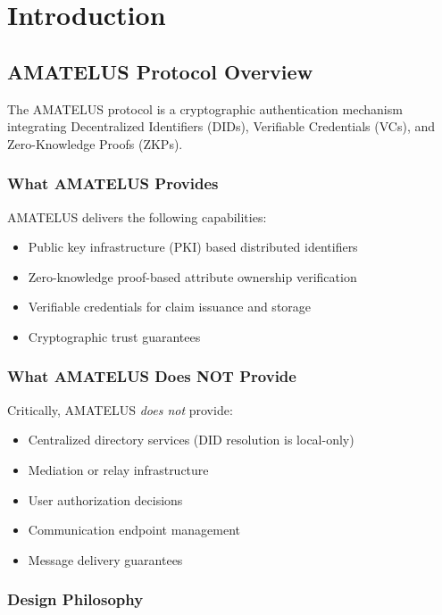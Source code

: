 \chapter{Introduction}

\section{AMATELUS Protocol Overview}

The AMATELUS protocol is a cryptographic authentication mechanism integrating Decentralized Identifiers (DIDs), Verifiable Credentials (VCs), and Zero-Knowledge Proofs (ZKPs).

\subsection{What AMATELUS Provides}

AMATELUS delivers the following capabilities:
\begin{itemize}
  \item Public key infrastructure (PKI) based distributed identifiers
  \item Zero-knowledge proof-based attribute ownership verification
  \item Verifiable credentials for claim issuance and storage
  \item Cryptographic trust guarantees
\end{itemize}

\subsection{What AMATELUS Does NOT Provide}

Critically, AMATELUS \emph{does not} provide:
\begin{itemize}
  \item Centralized directory services (DID resolution is local-only)
  \item Mediation or relay infrastructure
  \item User authorization decisions
  \item Communication endpoint management
  \item Message delivery guarantees
\end{itemize}

\subsection{Design Philosophy}

